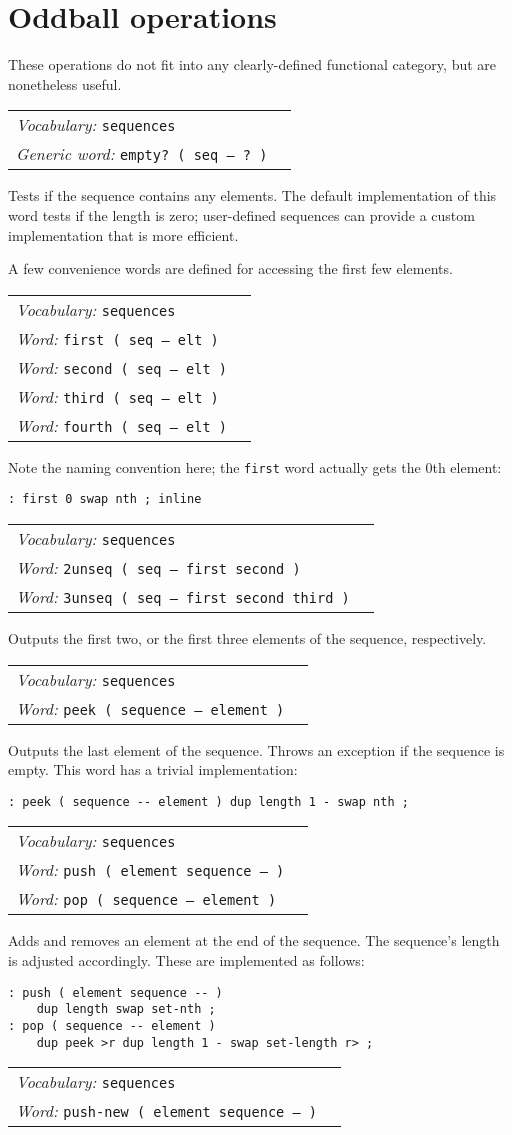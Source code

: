 \documentclass{book}
\newcommand{\vocabulary}[1]{\emph{Vocabulary:} \texttt{#1}&\\}
\newcommand{\ordinaryword}[2]{\index{\texttt{#1}}\emph{Word:} \texttt{#2}&\\}
\newcommand{\genericword}[2]{\index{\texttt{#1}}\emph{Generic word:} \texttt{#2}&\\}
\newcommand{\wordtable}[1]{


\begin{tabularx}{12cm}{lX}
\hline
#1
\hline
\end{tabularx}

}
\begin{document}
\section{Oddball operations}\label{oddball-seq}

These operations do not fit into any clearly-defined functional category, but are nonetheless useful.
\wordtable{
\vocabulary{sequences}
\genericword{empty?}{empty?~( seq -- ?~)}
}
Tests if the sequence contains any elements. The default implementation of this word tests if the length is zero; user-defined sequences can provide a custom implementation that is more efficient.

A few convenience words are defined for accessing the first few elements.
\wordtable{
\vocabulary{sequences}
\ordinaryword{first}{first ( seq -- elt )}
\ordinaryword{second}{second ( seq -- elt )}
\ordinaryword{third}{third ( seq -- elt )}
\ordinaryword{fourth}{fourth ( seq -- elt )}
}
Note the naming convention here; the \verb|first| word actually gets the 0th element:
\begin{verbatim}
: first 0 swap nth ; inline
\end{verbatim}
\wordtable{
\vocabulary{sequences}
\ordinaryword{2unseq}{2unseq ( seq -- first second )}
\ordinaryword{3unseq}{3unseq ( seq -- first second third )}
}
Outputs the first two, or the first three elements of the sequence, respectively.

\wordtable{
\vocabulary{sequences}
\ordinaryword{peek}{peek ( sequence -- element )}
}
Outputs the last element of the sequence. Throws an exception if the sequence is empty. This word has a trivial implementation:
\begin{verbatim}
: peek ( sequence -- element ) dup length 1 - swap nth ;
\end{verbatim}

\wordtable{
\vocabulary{sequences}
\ordinaryword{push}{push ( element sequence -- )}
\ordinaryword{pop}{pop ( sequence -- element )}
}

Adds and removes an element at the end of the sequence. The sequence's length is adjusted accordingly. These are implemented as follows:
\begin{verbatim}
: push ( element sequence -- )
    dup length swap set-nth ;
: pop ( sequence -- element )
    dup peek >r dup length 1 - swap set-length r> ;
\end{verbatim}

\wordtable{
\vocabulary{sequences}
\ordinaryword{push-new}{push-new ( element sequence -- )}
}
\end{document}
